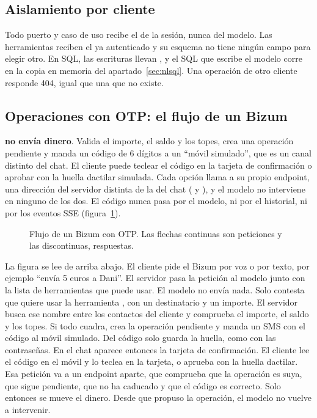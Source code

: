 \subsection{Aislamiento por cliente}\label{sec:aislamiento}

Todo puerto y caso de uso recibe el  de la sesión, nunca del modelo. Las herramientas reciben el
 ya autenticado y su esquema no tiene ningún campo para elegir otro. En SQL, las escrituras llevan
, y el SQL que escribe el modelo corre en la copia en memoria del
apartado~\ref{sec:nlsql}. Una operación de otro cliente responde 404, igual que una que no existe.

\subsection{Operaciones con OTP: el flujo de un Bizum}\label{sec:otp}

 \textbf{no envía dinero}. Valida el importe, el saldo y los topes, crea una operación pendiente
y manda un código de 6 dígitos a un ``móvil simulado'', que es un canal distinto del chat. El cliente puede teclear el
código en la tarjeta de confirmación o aprobar con la huella dactilar simulada. Cada opción llama a su propio endpoint, una
dirección del servidor distinta de la del chat ( y ), y el modelo no
interviene en ninguno de los dos. El código nunca pasa por el modelo, ni por el historial, ni por
los eventos SSE (figura~\ref{fig:secuencia-bizum}).

\begin{figure}[htbp]
  \centering
  
  \caption{Flujo de un Bizum con OTP. Las flechas continuas son peticiones y las discontinuas, respuestas.}
  \label{fig:secuencia-bizum}
\end{figure}

La figura se lee de arriba abajo. El cliente pide el Bizum por voz o por texto, por ejemplo ``envía 5 euros a Dani''.
El servidor pasa la petición al modelo junto con la lista de herramientas que puede usar. El modelo no envía nada.
Solo contesta que quiere usar la herramienta , con un destinatario y un importe. El servidor
busca ese nombre entre los contactos del cliente y comprueba el importe, el saldo y los topes. Si todo cuadra, crea la
operación pendiente y manda un SMS con el código al móvil simulado. Del código solo guarda la huella, como con las
contraseñas. En el chat aparece entonces la tarjeta de confirmación. El cliente lee el código en el móvil y lo teclea
en la tarjeta, o aprueba con la huella dactilar. Esa petición va a un endpoint aparte, que comprueba que la operación
es suya, que sigue pendiente, que no ha caducado y que el código es correcto. Solo entonces se mueve el dinero. Desde
que propuso la operación, el modelo no vuelve a intervenir.

